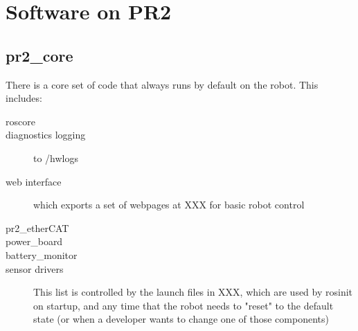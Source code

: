 \chapter{Software on PR2}
\section{pr2\_core}
There is a core set of code that always runs by default on the robot.  This includes:
\begin{description}
\item[roscore]
\item[diagnostics logging] to /hwlogs
\item[web interface] which exports a set of webpages at XXX for basic robot control
\item[pr2\_etherCAT]
\item[power\_board]
\item[battery\_monitor]
\item[sensor drivers]
This list is controlled by the launch files in XXX, which are used by rosinit on startup, and any time that the robot needs to "reset" to the default state (or when a developer wants to change one of those components)
\end{description} 
